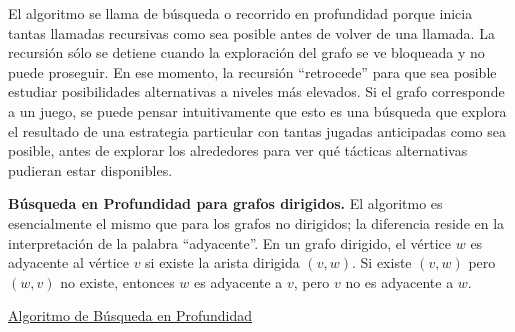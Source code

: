 El algoritmo se llama de búsqueda o recorrido en profundidad porque inicia tantas llamadas recursivas como sea posible antes de volver de una llamada. La recursión sólo se detiene cuando la exploración del grafo se ve bloqueada y no puede proseguir. En ese momento, la recursión ``retrocede'' para que sea posible estudiar posibilidades alternativas a niveles más elevados. Si el grafo corresponde a un juego, se puede pensar intuitivamente que esto es una búsqueda que explora el resultado de una estrategia particular con tantas jugadas anticipadas como sea posible, antes de explorar los alrededores para ver qué tácticas alternativas pudieran estar disponibles.\\

\begin{nota}
\textbf{Búsqueda en Profundidad para grafos dirigidos.} El algoritmo es esencialmente el mismo que para los grafos no dirigidos; la diferencia reside en la interpretación de la palabra ``adyacente''. En un grafo dirigido, el vértice $w$ es adyacente al vértice $v$ si existe la arista dirigida $(v,w)$. Si existe $(v,w)$ pero $(w,v)$ no existe, entonces $w$ es adyacente a $v$, pero $v$ no es adyacente a $w$.\\
\end{nota}

\underline{Algoritmo de Búsqueda en Profundidad}\\



